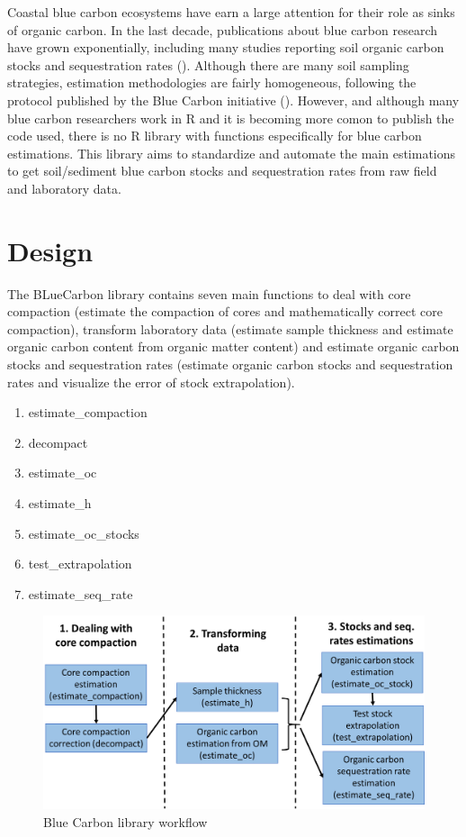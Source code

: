 \documentclass[10pt,a4paper,onecolumn]{article}
\begin{document}
Coastal blue carbon ecosystems have earn a large attention for their
role as sinks of organic carbon. In the last decade, publications about
blue carbon research have grown exponentially, including many studies
reporting soil organic carbon stocks and sequestration rates ().
Although there are many soil sampling strategies, estimation
methodologies are fairly homogeneous, following the protocol published
by the Blue Carbon initiative (). However, and although many blue carbon
researchers work in R and it is becoming more comon to publish the code
used, there is no R library with functions especifically for blue carbon
estimations. This library aims to standardize and automate the main
estimations to get soil/sediment blue carbon stocks and sequestration
rates from raw field and laboratory data.

\hypertarget{design}{%
\section{Design}\label{design}}

The BLueCarbon library contains seven main functions to deal with core
compaction (estimate the compaction of cores and mathematically correct
core compaction), transform laboratory data (estimate sample thickness
and estimate organic carbon content from organic matter content) and
estimate organic carbon stocks and sequestration rates (estimate organic
carbon stocks and sequestration rates and visualize the error of stock
extrapolation).

\begin{enumerate}
\def\labelenumi{\arabic{enumi}.}
\item
  estimate\_compaction
\item
  decompact
\item
  estimate\_oc
\item
  estimate\_h
\item
  estimate\_oc\_stocks
\item
  test\_extrapolation
\item
  estimate\_seq\_rate
\end{enumerate}

\begin{figure}
\centering
\includegraphics{images/BC_workflow-01.png}
\caption{Blue Carbon library workflow}
\end{figure}
\end{document}
